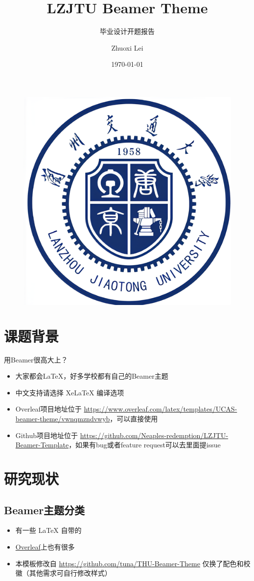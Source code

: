 \documentclass{beamer}
\author{Zhuoxi Lei}
\title{LZJTU Beamer Theme}
\subtitle{毕业设计开题报告}
\institute{兰州交通大学机电工程学院}
\date{\today}
\begin{document}
	
	\kaishu
	\begin{frame}
		\titlepage
		\begin{figure}[htpb]
			\begin{center}
				\includegraphics[width=0.2\linewidth]{pic/LZJT_Logo.png}
			\end{center}
		\end{figure}
	\end{frame}
	
	\begin{frame}
		\tableofcontents[sectionstyle=show,subsectionstyle=show/shaded/hide,subsubsectionstyle=show/shaded/hide]
	\end{frame}
	
	
	\section{课题背景}
	
	\begin{frame}{用Beamer很高大上？}
		\begin{itemize}[<+-| alert@+>] %
			\item 大家都会\LaTeX{}，好多学校都有自己的Beamer主题
			\item 中文支持请选择 Xe\LaTeX{} 编译选项
			\item Overleaf项目地址位于 \url{https://www.overleaf.com/latex/templates/UCAS-beamer-theme/vwnqmzndvwyb}，可以直接使用
			\item Github项目地址位于 \url{https://github.com/Neaples-redemption/LZJTU-Beamer-Template}，如果有bug或者feature request可以去里面提issue
		\end{itemize}
	\end{frame}
	
	
	\section{研究现状}
	
	\subsection{Beamer主题分类}
	
	\begin{frame}
		\begin{itemize}
			\item 有一些 \LaTeX{} 自带的
			\item \href{https://www.overleaf.com/latex/templates}{Overleaf}上也有很多
			\item 本模板修改自
			\newline
			\url{https://github.com/tuna/THU-Beamer-Theme}
			\newline
			仅换了配色和校徽（其他需求可自行修改样式）
		\end{itemize}
	\end{frame}
	
\end{document}
